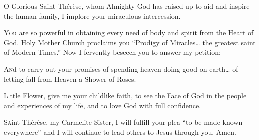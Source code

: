 {\centering\Large{\MakeUppercase{}}\par}

\begin{enpars}
\lettrine{O}{} Glorious Saint Thérèse,
whom Almighty God has raised up to aid
and inspire the human family,
I implore your miraculous intercession.

\lettrine{Y}{o}u are so powerful in obtaining every need
of body and spirit from the Heart of God.
Holy Mother Church proclaims you ``Prodigy of Miracles…
the greatest saint of Modern Times.'' Now I fervently beseech you to answer my petition:


\lettrine{A}{n}d to carry out your promises of
spending heaven doing good on earth…
of letting fall from Heaven a Shower of Roses.

\lettrine{L}{i}ttle Flower, give me your childlike faith,
to see the Face of God
in the people and experiences of my life,
and to love God with full confidence.

\lettrine{S}{a}int Thérèse, my Carmelite Sister,
I will fulfill your plea ``to be made known everywhere''
and I will continue to lead others to Jesus through you. Amen.
\end{enpars}



